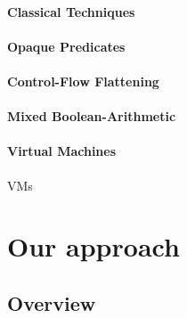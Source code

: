 \subsubsection{Classical Techniques}

\subsubsection{Opaque Predicates}

\subsubsection{Control-Flow Flattening}

\subsubsection{Mixed Boolean-Arithmetic}

\subsubsection{Virtual Machines}

\cite{malware_obf}



\Glspl{VM} 

\chapter{Our approach}


\section{Overview}

